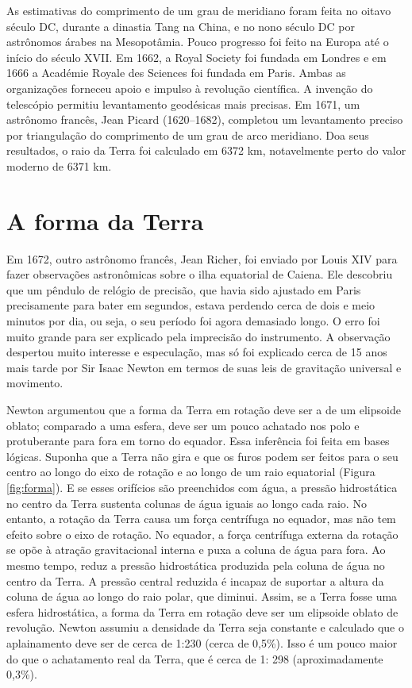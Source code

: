 \documentclass[]{book}
\theoremstyle{definition}
\theoremstyle{definition}
\theoremstyle{definition}
\theoremstyle{remark}
\begin{document}
As estimativas do comprimento de um grau de meridiano foram feita no oitavo século DC, durante a dinastia Tang na China, e no nono século DC por astrônomos árabes na Mesopotâmia. Pouco progresso foi feito na Europa até o início do século XVII. Em 1662, a Royal Society foi fundada em Londres e em 1666 a Académie Royale des Sciences foi fundada em Paris. Ambas as organizações forneceu apoio e impulso à revolução científica. A invenção do telescópio permitiu levantamento geodésicas mais precisas. Em 1671, um astrônomo francês, Jean Picard (1620--1682), completou um levantamento preciso por triangulação do comprimento de um grau de arco meridiano. Doa seus resultados, o raio da Terra foi calculado em 6372 km, notavelmente perto do valor moderno de 6371 km.

\hypertarget{a-forma-da-terra}{%
\section{A forma da Terra}\label{a-forma-da-terra}}

Em 1672, outro astrônomo francês, Jean Richer, foi enviado por Louis XIV para fazer observações astronômicas sobre o ilha equatorial de Caiena. Ele descobriu que um pêndulo de relógio de precisão, que havia sido ajustado em Paris precisamente para bater em segundos, estava perdendo cerca de dois e meio minutos por dia, ou seja, o seu período foi agora demasiado longo. O erro foi muito grande para ser explicado pela imprecisão do instrumento. A observação despertou muito interesse e especulação, mas só foi explicado cerca de 15 anos mais tarde por Sir Isaac Newton em termos de suas leis de gravitação universal e movimento.

Newton argumentou que a forma da Terra em rotação deve ser a de um elipsoide oblato; comparado a uma esfera, deve ser um pouco achatado nos polo e protuberante para fora em torno do equador. Essa inferência foi feita em bases lógicas. Suponha que a Terra não gira e que os furos podem ser feitos para o seu centro ao longo do eixo de rotação e ao longo de um raio equatorial (Figura \ref{fig:forma}). E se esses orifícios são preenchidos com água, a pressão hidrostática no centro da Terra sustenta colunas de água iguais ao longo cada raio. No entanto, a rotação da Terra causa um força centrífuga no equador, mas não tem efeito sobre o eixo de rotação. No equador, a força centrífuga externa da rotação se opõe à atração gravitacional interna e puxa a coluna de água para fora. Ao mesmo tempo, reduz a pressão hidrostática produzida pela coluna de água no centro da Terra. A pressão central reduzida é incapaz de suportar a altura da coluna de água ao longo do raio polar, que diminui. Assim, se a Terra fosse uma esfera hidrostática, a forma da Terra em rotação deve ser um elipsoide oblato de revolução. Newton assumiu a densidade da Terra seja constante e calculado que o aplainamento deve ser de cerca de 1:230 (cerca de 0,5\%). Isso é um pouco maior do que o achatamento real da Terra, que é cerca de 1: 298 (aproximadamente 0,3\%).
\end{document}
